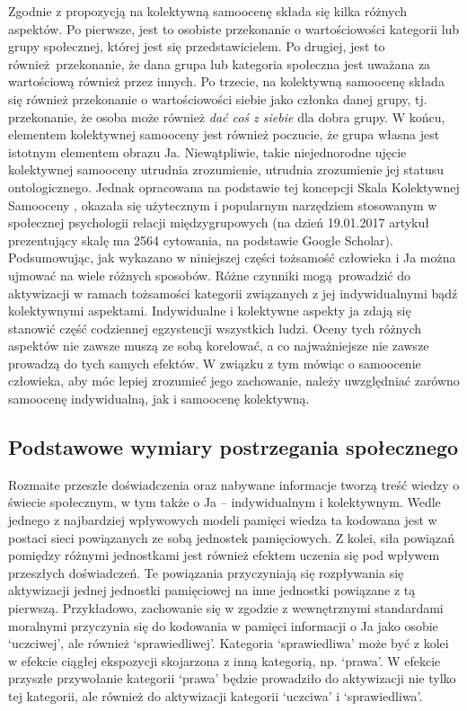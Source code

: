 \documentclass[man]{apa6}
\begin{document}
Zgodnie z propozycją \textcite{luhtanen1992collective} na kolektywną samoocenę składa się kilka różnych aspektów. Po pierwsze, jest to osobiste przekonanie o wartościowości kategorii lub grupy społecznej, której jest się przedstawicielem. Po drugiej, jest to również przekonanie, że dana grupa lub kategoria społeczna jest uważana za wartościową również przez innych. Po trzecie, na kolektywną samoocenę składa się również przekonanie o wartościowości siebie jako członka danej grupy, tj. przekonanie, że osoba może również \emph{dać coś z siebie} dla dobra grupy. W końcu, elementem kolektywnej samooceny jest również poczucie, że grupa własna jest istotnym elementem obrazu Ja. Niewątpliwie, takie niejednorodne ujęcie kolektywnej samooceny utrudnia zrozumienie, utrudnia zrozumienie jej statusu ontologicznego. Jednak opracowana na podstawie tej koncepcji Skala Kolektywnej Samooceny \parencite{luhtanen1992collective}, okazała się użytecznym i popularnym narzędziem stosowanym w społecznej psychologii relacji międzygrupowych (na dzień 19.01.2017 artykuł prezentujący skalę ma 2564 cytowania, na podstawie Google Scholar).\\

Podsumowując, jak wykazano w niniejszej części tożsamość człowieka i Ja można ujmować na wiele różnych sposobów. Różne czynniki mogą prowadzić do aktywizacji w ramach tożsamości kategorii związanych z jej indywidualnymi bądź kolektywnymi aspektami. Indywidualne i kolektywne aspekty ja zdają się stanowić część codziennej egzystencji wszystkich ludzi. Oceny tych różnych aspektów nie zawsze muszą ze sobą korelować, a co najważniejsze nie zawsze prowadzą do tych samych efektów. W związku z tym mówiąc o samoocenie człowieka, aby móc lepiej zrozumieć jego zachowanie, należy uwzględniać zarówno samoocenę indywidualną, jak i samoocenę kolektywną.\\

\newpage
\subsection{Podstawowe wymiary postrzegania społecznego}

Rozmaite przeszłe doświadczenia oraz nabywane informacje tworzą treść wiedzy o świecie społecznym, w tym także o Ja -- indywidualnym i kolektywnym. Wedle jednego z najbardziej wpływowych modeli pamięci \parencite{anderson1983spreading} wiedza ta kodowana jest w postaci sieci powiązanych ze sobą jednostek pamięciowych. Z kolei, siła powiązań pomiędzy różnymi jednostkami jest również efektem uczenia się pod wpływem przeszłych doświadczeń. Te powiązania przyczyniają się rozpływania się aktywizacji jednej jednostki pamięciowej na inne jednostki powiązane z tą pierwszą. Przykładowo, zachowanie się w zgodzie z wewnętrznymi standardami moralnymi przyczynia się do kodowania w pamięci informacji o Ja jako osobie `uczciwej', ale również `sprawiedliwej'. Kategoria `sprawiedliwa' może być z kolei w efekcie ciągłej ekspozycji skojarzona z inną kategorią, np. `prawa'. W efekcie przyszłe przywołanie kategorii `prawa' będzie prowadziło do aktywizacji nie tylko tej kategorii, ale również do aktywizacji kategorii `uczciwa' i `sprawiedliwa'.\\
\end{document}
